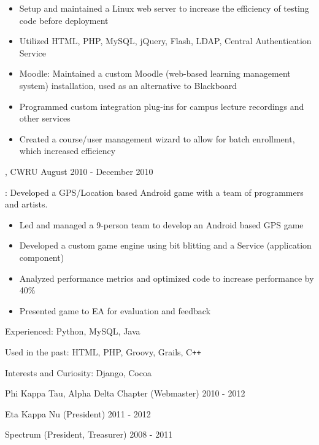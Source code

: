 \documentclass[10pt, letterpaper]{article}
\begin{document}
\begin{itemize}
\item Setup and maintained a Linux web server to increase the efficiency of testing code before deployment
\item Utilized HTML, PHP, MySQL, jQuery, Flash, LDAP,  Central Authentication Service
\item Moodle: Maintained a custom Moodle (web-based learning management system) installation, used as an alternative to Blackboard %
\item Programmed custom integration plug-ins for campus lecture recordings and other services
\item Created a course/user management wizard to allow for batch enrollment, which increased efficiency
\end{itemize}

\bigskip
{},   \hfill CWRU \hfill August 2010 - December 2010

\hangindent=15pt
: Developed a GPS/Location based Android game with a team of programmers and artists.

\begin{itemize}
\item Led and managed a 9-person team to develop an Android based GPS game
\item Developed a custom game engine using bit blitting and a Service (application component)
\item Analyzed performance metrics and optimized code to increase performance by 40\%
\item Presented game to EA for evaluation and feedback
\end{itemize}

\bigskip


Experienced: Python, MySQL, Java

Used in the past: HTML, PHP,  Groovy, Grails, C\verb!++!

Interests and Curiosity: Django, Cocoa

\bigskip


Phi Kappa Tau, Alpha Delta Chapter (Webmaster) \hfill 2010 - 2012

Eta Kappa Nu (President) \hfill 2011 - 2012

Spectrum (President, Treasurer) \hfill 2008 - 2011
\end{document}
